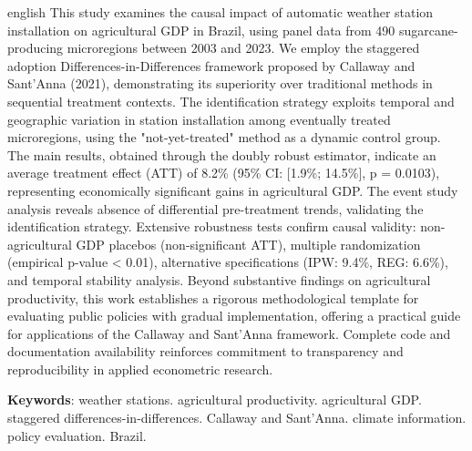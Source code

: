 \documentclass[
	12pt,				%
	oneside,			%
	a4paper,			%
	english,			%
	french,				%
	spanish,			%
	brazil				%
	]{abntex2}
\begin{document}
\begin{resumo}[Abstract]
 \begin{otherlanguage*}{english}
This study examines the causal impact of automatic weather station installation on agricultural GDP in Brazil, using panel data from 490 sugarcane-producing microregions between 2003 and 2023. We employ the staggered adoption Differences-in-Differences framework proposed by Callaway and Sant'Anna (2021), demonstrating its superiority over traditional methods in sequential treatment contexts. The identification strategy exploits temporal and geographic variation in station installation among eventually treated microregions, using the "not-yet-treated" method as a dynamic control group. The main results, obtained through the doubly robust estimator, indicate an average treatment effect (ATT) of 8.2\% (95\% CI: [1.9\%; 14.5\%], p = 0.0103), representing economically significant gains in agricultural GDP. The event study analysis reveals absence of differential pre-treatment trends, validating the identification strategy. Extensive robustness tests confirm causal validity: non-agricultural GDP placebos (non-significant ATT), multiple randomization (empirical p-value < 0.01), alternative specifications (IPW: 9.4\%, REG: 6.6\%), and temporal stability analysis. Beyond substantive findings on agricultural productivity, this work establishes a rigorous methodological template for evaluating public policies with gradual implementation, offering a practical guide for applications of the Callaway and Sant'Anna framework. Complete code and documentation availability reinforces commitment to transparency and reproducibility in applied econometric research.

   \textbf{Keywords}: weather stations. agricultural productivity. agricultural GDP. staggered differences-in-differences. Callaway and Sant'Anna. climate information. policy evaluation. Brazil.
 \end{otherlanguage*}
\end{resumo}

\listoffigures*
\cleardoublepage

\listoftables*
\cleardoublepage

\tableofcontents*
\cleardoublepage

\textual
\end{document}
